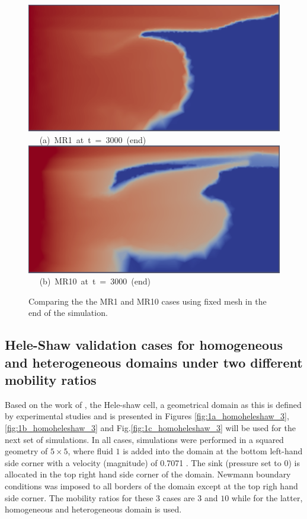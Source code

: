\documentclass[preprint,authoryear,12pt]{elsarticle}
\begin{document}
\begin{figure}[h]
\vbox{
\hbox{\hspace{1.5cm}
\includegraphics[width=.75\textwidth]{./Pics1/mr1_fixed/mr1_fixed_middle_1.pdf} 
}
\vspace{0.0cm}
\hbox{\hspace{5.0cm} (a) MR1 at t = 3000 (end)   
}
\vspace{0.25cm}
\hbox{\hspace{1.5cm}
\includegraphics[width=.75\textwidth]{./Pics1/mr10_fixed/mr10_fixed_middle_1.pdf}
}
\vspace{0.0cm}
\hbox{\hspace{5.0cm} (b) MR10 at t = 3000 (end)  
}
}     
\caption{Comparing the the MR1 and MR10 cases using fixed mesh in the end of the simulation.}
\label{fig:6c}
\end{figure}

\subsection{Hele-Shaw validation cases for homogeneous and heterogeneous domains under two different mobility ratios}

\medskip
Based on the work of \citet{saffman_1986}, the Hele-shaw cell, a geometrical domain as this is defined by experimental studies and is presented in Figures \ref{fig:1a_homoheleshaw_3},\ref{fig:1b_homoheleshaw_3} and Fig.\ref{fig:1c_homoheleshaw_3} will be used for the next set of simulations. In all cases, simulations were performed in a squared geometry of $5\times5$, where fluid $1$ is added into the domain at the bottom left-hand side corner with a velocity (magnitude) of 0.7071 %
. The sink (pressure set to $0$) is allocated in the top right hand side corner of the domain. Newmann boundary conditions %
was imposed to all borders of the domain except at the top righ hand side corner. The mobility ratios for these $3$ cases are $3$ and $10$ while for the latter, homogeneous and heterogeneous domain is used.
\end{document}
